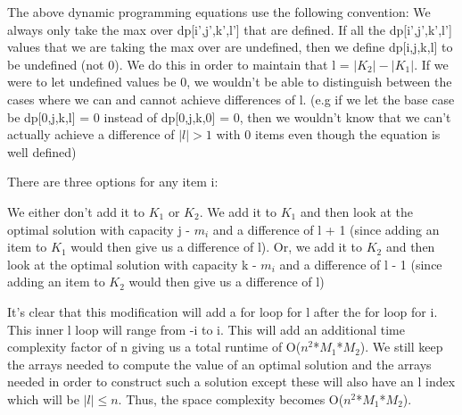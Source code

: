 \documentclass[11pt,a4paper]{article}
\begin{document}
The above dynamic programming equations use the following convention: We always only take the max over dp[i',j',k',l'] that are defined. If all the dp[i',j',k',l'] values that we are taking the max over are undefined, then we define dp[i,j,k,l] to be undefined (not 0). We do this in order to maintain that l = $|K_{2}| - |K_{1}|$. If we were to let undefined values be 0, we wouldn't be able to distinguish between the cases where we can and cannot achieve differences of l. (e.g if we let the base case be dp[0,j,k,l] = 0 instead of dp[0,j,k,0] = 0, then we wouldn't know that we can't actually achieve a difference of $|l| > 1$ with 0 items even though the equation is well defined)

There are three options for any item i:

We either don't add it to $K_{1}$ or $K_{2}$. We add it to $K_{1}$ and then look at the optimal solution with capacity j - $m_{i}$ and a difference of l + 1 (since adding an item to $K_{1}$ would then give us a difference of l). Or, we add it to $K_{2}$ and then look at the optimal solution with capacity k - $m_{i}$ and a difference of l - 1 (since adding an item to $K_{2}$ would then give us a difference of l)

It's clear that this modification will add a for loop for l after the for loop for i. This inner l loop will range from -i to i. This will add an additional time complexity factor of n giving us a total runtime of O($n^{2}$*$M_{1}$*$M_{2}$).  We still keep the arrays needed to compute the value of an optimal solution and the arrays needed in order to construct such a solution except these will also have an l index which will be $|l| \leq n$. Thus, the space complexity becomes O($n^{2}$*$M_{1}$*$M_{2}$).
\end{document}
